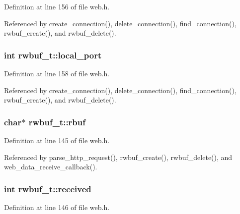 Definition at line 156 of file web.\+h.



Referenced by create\+\_\+connection(), delete\+\_\+connection(), find\+\_\+connection(), rwbuf\+\_\+create(), and rwbuf\+\_\+delete().

\subsubsection[{\texorpdfstring{local\+\_\+port}{local_port}}]{\setlength{\rightskip}{0pt plus 5cm}int rwbuf\+\_\+t\+::local\+\_\+port}\hypertarget{structrwbuf__t_aac758cef289d022f4eb81d4c4fac7f04}{}\label{structrwbuf__t_aac758cef289d022f4eb81d4c4fac7f04}


Definition at line 158 of file web.\+h.



Referenced by create\+\_\+connection(), delete\+\_\+connection(), find\+\_\+connection(), rwbuf\+\_\+create(), and rwbuf\+\_\+delete().

\subsubsection[{\texorpdfstring{rbuf}{rbuf}}]{\setlength{\rightskip}{0pt plus 5cm}char$\ast$ rwbuf\+\_\+t\+::rbuf}\hypertarget{structrwbuf__t_afd83372241273849c9395d587b146021}{}\label{structrwbuf__t_afd83372241273849c9395d587b146021}


Definition at line 145 of file web.\+h.



Referenced by parse\+\_\+http\+\_\+request(), rwbuf\+\_\+create(), rwbuf\+\_\+delete(), and web\+\_\+data\+\_\+receive\+\_\+callback().

\subsubsection[{\texorpdfstring{received}{received}}]{\setlength{\rightskip}{0pt plus 5cm}int rwbuf\+\_\+t\+::received}\hypertarget{structrwbuf__t_ac76412a0fbf9dc009ae3f8bb20660883}{}\label{structrwbuf__t_ac76412a0fbf9dc009ae3f8bb20660883}


Definition at line 146 of file web.\+h.




